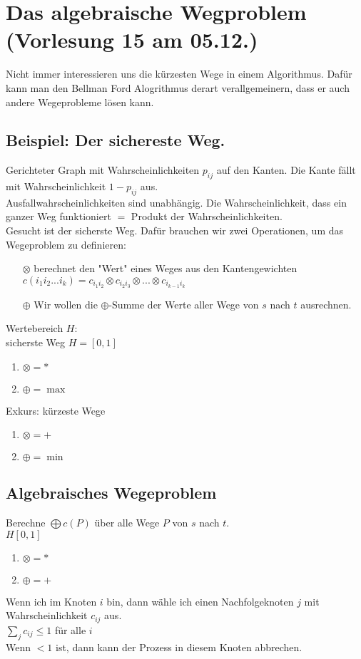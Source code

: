 \section{Das algebraische Wegproblem \tiny (Vorlesung 15 am 05.12.)}
Nicht immer interessieren uns die kürzesten Wege in einem Algorithmus. Dafür kann man den Bellman Ford Alogrithmus derart verallgemeinern, dass er auch andere Wegeprobleme lösen kann.\\
\subsection{Beispiel: Der sichereste Weg.}
Gerichteter Graph mit Wahrscheinlichkeiten $p_{ij}$ auf den Kanten. Die Kante fällt mit Wahrscheinlichkeit $1-p_{ij}$ aus.\\
Ausfallwahrscheinlichkeiten sind unabhängig. Die Wahrscheinlichkeit, dass ein ganzer Weg funktioniert $=$ Produkt der Wahrscheinlichkeiten.\\
Gesucht ist der sicherste Weg. Dafür brauchen wir zwei Operationen, um das Wegeproblem zu definieren:
\begin{enumerate}
\item[$\otimes$] berechnet den "Wert" eines Weges aus den Kantengewichten
$c(i_1i_2...i_k) = c_{i_1i_2} \otimes c_{i_2i_3} \otimes ... \otimes c_{i_{k-1}i_{k}}$
\item[$\oplus$] Wir wollen die $\oplus$-Summe der Werte aller Wege von $s$ nach $t$ ausrechnen.
\end{enumerate}
Wertebereich $H$:\\
sicherste Weg $H=[0,1]$\\
\begin{enumerate}
\item $\otimes = *$
\item $\oplus = \max$
\end{enumerate}
Exkurs: kürzeste Wege\\
\begin{enumerate}
\item $\otimes = +$
\item $\oplus = \min$
\end{enumerate}


\subsection{Algebraisches Wegeproblem}
Berechne $\bigoplus c(P)$ über alle Wege $P$ von $s$ nach $t$.\\
$H[0,1]$\\
\begin{enumerate}
\item $\otimes = *$
\item $\oplus = +$
\end{enumerate}
Wenn ich im Knoten $i$ bin, dann wähle ich einen Nachfolgeknoten $j$ mit Wahrscheinlichkeit $c_{ij}$ aus.\\
$\sum_j c_{ij} \leq 1$ für alle $i$\\
Wenn $<1$ ist, dann kann der Prozess in diesem Knoten abbrechen.\\
